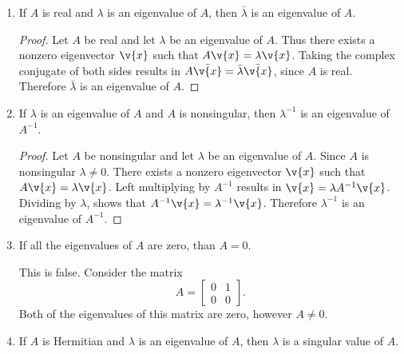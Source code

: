 \documentclass[11pt]{article}
\begin{document}
\begin{enumerate}
\begin{enumerate}
            \item %
                If $A$ is real and $\lambda$ is an eigenvalue of $A$, then
                $\bar{\lambda}$ is an eigenvalue of $A$.

                \begin{proof}
                    Let $A$ be real and let $\lambda$ be an eigenvalue of $A$.
                    Thus there exists a nonzero eigenvector $\v{x}$ such that
                    $A\v{x} = \lambda\v{x}$.
                    Taking the complex conjugate of both sides results in
                    $A\bar{\v{x}} = \bar{\lambda}\bar{\v{x}}$, since $A$ is
                    real.
                    Therefore $\bar{\lambda}$ is an eigenvalue of $A$.
                \end{proof}

            \item %
                If $\lambda$ is an eigenvalue of $A$ and $A$ is nonsingular, then
                $\lambda^{-1}$ is an eigenvalue of $A^{-1}$.

                \begin{proof}
                    Let $A$ be nonsingular and let $\lambda$ be an eigenvalue
                    of $A$.
                    Since $A$ is nonsingular $\lambda \neq 0$.
                    There exists a nonzero eigenvector $\v{x}$ such that
                    $A\v{x} = \lambda \v{x}$.
                    Left multiplying by $A^{-1}$ results in
                    $\v{x} = \lambda A^{-1} \v{x}$.
                    Dividing by $\lambda$, shows that
                    $A^{-1} \v{x} = \lambda^{-1} \v{x}$.
                    Therefore $\lambda^{-1}$ is an eigenvalue of $A^{-1}$.
                \end{proof}

            \item %
                If all the eigenvalues of $A$ are zero, than $A = 0$.

                This is false.
                Consider the matrix
                \[
                    A =
                    \begin{bmatrix}
                        0 & 1 \\
                        0 & 0
                    \end{bmatrix}.
                \]
                Both of the eigenvalues of this matrix are zero, however
                $A \neq 0$.

            \item %
                If $A$ is Hermitian and $\lambda$ is an eigenvalue of $A$, then
                $\lambda$ is a singular value of $A$.


\end{enumerate}
\end{enumerate}
\end{document}
